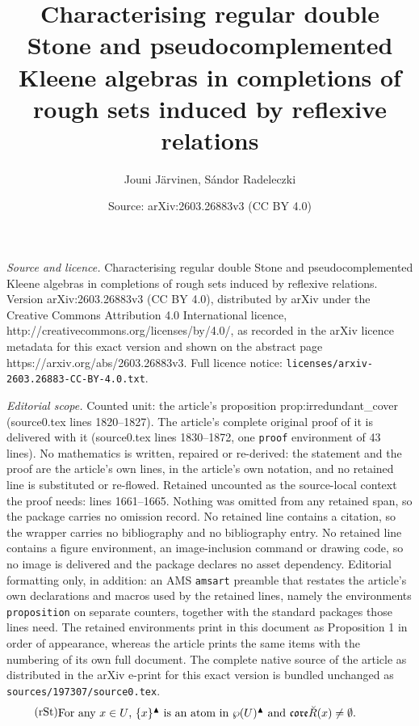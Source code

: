 \documentclass[10pt,a4paper]{amsart}
\title{Characterising regular double Stone and pseudocomplemented Kleene algebras in completions of rough sets induced by reflexive relations}
\author{Jouni J\"{a}rvinen, S\'{a}ndor Radeleczki}
\date{Source: arXiv:2603.26883v3 (CC BY 4.0)}
\newcommand{\UP}{\blacktriangle}
\begin{document}
\maketitle

\noindent\emph{Source and licence.} Characterising regular double Stone and pseudocomplemented Kleene algebras in completions of rough sets induced by reflexive relations. Version arXiv:2603.26883v3 (CC BY 4.0), distributed by arXiv under the Creative Commons Attribution 4.0 International licence, http://creativecommons.org/licenses/by/4.0/, as recorded in the arXiv licence metadata for this exact version and shown on the abstract page https://arxiv.org/abs/2603.26883v3. Full licence notice: \texttt{licenses/arxiv-2603.26883-CC-BY-4.0.txt}.\par\smallskip

\noindent\textit{Editorial scope.} Counted unit: the article's proposition prop:irredundant\_cover (source0.tex lines 1820--1827). The article's complete original proof of it is delivered with it (source0.tex lines 1830--1872, one \texttt{proof} environment of 43 lines). No mathematics is written, repaired or re-derived: the statement and the proof are the article's own lines, in the article's own notation, and no retained line is substituted or re-flowed.  Retained uncounted as the source-local context the proof needs: lines 1661--1665.  Nothing was omitted from any retained span, so the package carries no omission record.  No retained line contains a citation, so the wrapper carries no bibliography and no bibliography entry.  No retained line contains a figure environment, an image-inclusion command or drawing code, so no image is delivered and the package declares no asset dependency.  Editorial formatting only, in addition: an AMS \texttt{amsart} preamble that restates the article's own declarations and macros used by the retained lines, namely the environments \texttt{proposition} on separate counters, together with the standard packages those lines need.  The retained environments print in this document as Proposition 1 in order of appearance, whereas the article prints the same items with the numbering of its own full document.  The complete native source of the article as distributed in the arXiv e-print for this exact version is bundled unchanged as \texttt{sources/197307/source0.tex}.
\begin{equation} \tag{rSt} \label{eq:rSt}
\begin{minipage}[c]{0.9\textwidth}
 For any $x \in U$, $\{x\}^{\UP}$ is an atom in $\wp(U)^\UP$ and $\mathfrak{core}\breve{R}(x) \neq \emptyset$.
\end{minipage}
\end{equation}
\end{document}
